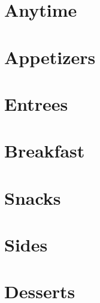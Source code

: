 \documentclass{book}
\begin{document}
\tableofcontents
\chapter{Anytime}




\chapter{Appetizers}


\chapter{Entrees}

\chapter{Breakfast}


\chapter{Snacks}

\chapter{Sides}

\chapter{Desserts}



\clearpage

\end{document}
